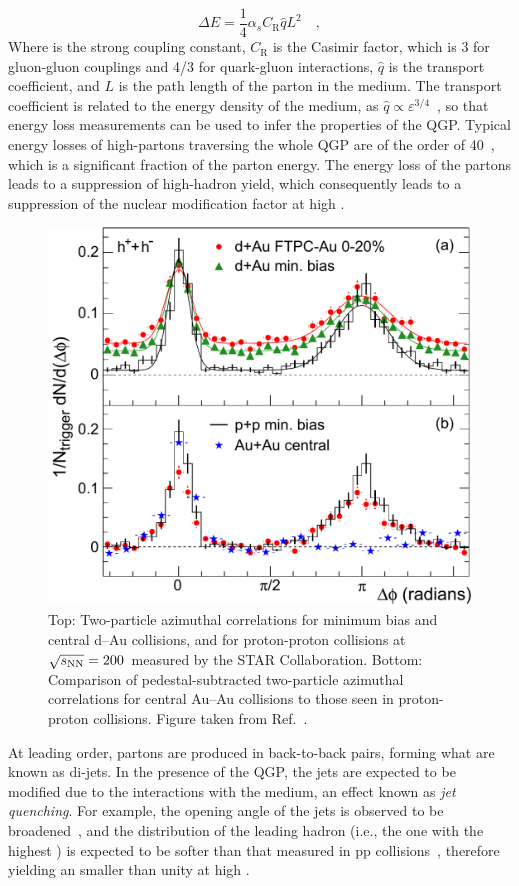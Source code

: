 \begin{equation*}
    \Delta E = \frac{1}{4}\alpha_s C_\mathrm{R}\hat{q}L^2\quad ,
\end{equation*}
Where \als is the strong coupling constant, $C_\mathrm{R}$ is the Casimir factor, which is 3 for gluon-gluon couplings and 4/3 for quark-gluon interactions, $\hat{q}$ is the transport coefficient, and $L$ is the path length of the parton in the medium. The transport coefficient is related to the energy density of the medium, as $\hat{q} \propto \varepsilon^{3/4}$~\cite{Baier:2002tc}, so that energy loss measurements can be used to infer the properties of the QGP. Typical energy losses of high-\pt partons traversing the whole QGP are of the order of 40~\gev, which is a significant fraction of the parton energy. The energy loss of the partons leads to a suppression of high-\pt hadron yield, which consequently leads to a suppression of the nuclear modification factor at high \pt. 

\begin{figure}[htb]
  \centering
  \includegraphics[width=0.7\linewidth]{Figures/Chapter 1/dAu_Fig4.pdf}
  \caption{Top: Two-particle azimuthal correlations for minimum bias and central d--Au collisions, and for proton-proton collisions at $\sqrt{s_\mathrm{NN}} = 200$~\gev measured by the STAR Collaboration. Bottom: Comparison of pedestal-subtracted two-particle azimuthal correlations for central Au--Au collisions to those seen in proton-proton collisions. Figure taken from Ref.~\cite{STAR:2003pjh}.}
  \label{fig:azimuthal_correlations}
\end{figure}

At leading order, partons are produced in back-to-back pairs, forming what are known as di-jets. In the presence of the QGP, the jets are expected to be modified due to the interactions with the medium, an effect known as \emph{jet quenching}. For example, the opening angle of the jets is observed to be broadened~\cite{ALICE:2015tra}, and the \pt distribution of the leading hadron (i.e., the one with the highest \pt) is expected to be softer than that measured in pp collisions~\cite{ATLAS:2017xfa}, therefore yielding an \raa smaller than unity at high \pt. 

